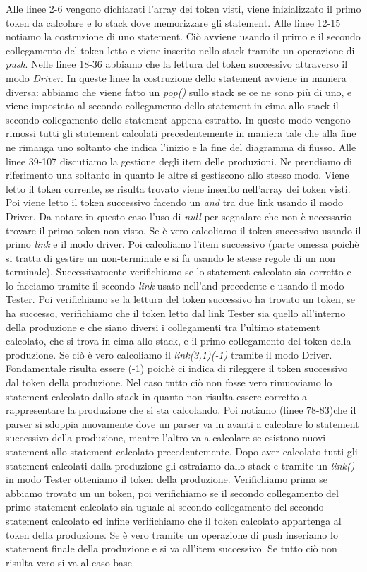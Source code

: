 Alle linee 2-6 vengono dichiarati l'array dei token visti, viene inizializzato il primo token da calcolare e lo stack dove memorizzare gli statement. Alle linee 12-15 notiamo la costruzione di uno statement. Ciò avviene usando il primo e il secondo collegamento del token letto e viene inserito nello stack tramite un operazione di \textit{push}. Nelle linee 18-36 abbiamo che la lettura del token successivo attraverso il modo \textit{Driver}. In queste linee la costruzione dello statement avviene in maniera diversa: abbiamo che viene fatto un \textit{pop()} sullo stack se ce ne sono più di uno, e viene impostato al secondo collegamento dello statement in cima allo stack il secondo collegamento dello statement appena estratto. In questo modo vengono rimossi tutti gli statement calcolati precedentemente in maniera tale che alla fine ne rimanga uno soltanto che indica l'inizio e la fine del diagramma di flusso. Alle linee 39-107 discutiamo la gestione degli item delle produzioni. Ne prendiamo di riferimento una soltanto in quanto le altre si gestiscono allo stesso modo. Viene letto il token corrente, se risulta trovato viene inserito nell'array dei token visti. Poi viene letto il token successivo facendo un \textit{and} tra due link usando il modo Driver. Da notare in questo caso l'uso di \textit{null} per segnalare che non è necessario trovare il primo token non visto. Se è vero calcoliamo il token successivo usando il primo \textit{link} e il modo driver. Poi calcoliamo l'item successivo (parte omessa poichè si tratta di gestire un non-terminale e si fa usando le stesse regole di un non terminale). Successivamente verifichiamo se lo statement calcolato sia corretto e lo facciamo tramite il secondo \textit{link} usato nell'and precedente e usando il modo Tester. Poi verifichiamo se la lettura del token successivo ha trovato un token, se ha successo, verifichiamo che il token letto dal link Tester sia quello all'interno della produzione e che siano diversi i collegamenti tra l'ultimo statement calcolato, che si trova in cima allo stack, e il primo collegamento del token della produzione. Se ciò è vero calcoliamo il \textit{link(3,1)(-1)} tramite il modo Driver. Fondamentale risulta essere (-1) poichè ci indica di rileggere il token successivo dal token della produzione. Nel caso tutto ciò non fosse vero rimuoviamo lo statement calcolato dallo stack in quanto non risulta essere corretto a rappresentare la produzione che si sta calcolando. Poi notiamo (linee 78-83)che il parser si sdoppia nuovamente dove un parser va in avanti a calcolare lo statement successivo della produzione, mentre l'altro va a calcolare se esistono nuovi statement allo statement calcolato precedentemente. Dopo aver calcolato tutti gli statement calcolati dalla produzione gli estraiamo dallo stack e tramite un \textit{link()} in modo Tester otteniamo il token della produzione. Verifichiamo prima se abbiamo trovato un un token, poi verifichiamo se il secondo collegamento del primo statement calcolato sia uguale al secondo collegamento del secondo statement calcolato ed infine verifichiamo che il token calcolato appartenga al token della produzione. Se è vero tramite un operazione di push inseriamo lo statement finale della produzione e si va all'item successivo. Se tutto ciò non risulta vero si va al caso base 